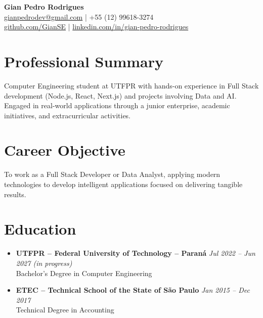 \documentclass[a4paper,10pt]{article}
\begin{document}
\vspace*{-1cm}
\begin{center}
    {\LARGE \textbf{Gian Pedro Rodrigues}}\\
    \vspace{0.2cm}
    \href{mailto:gianpedrodev@gmail.com}{gianpedrodev@gmail.com} \quad | \quad +55 (12) 99618-3274\\
    \href{https://github.com/GianSE}{github.com/GianSE} \quad | \quad 
    \href{https://linkedin.com/in/gian-pedro-rodrigues-330397163}{linkedin.com/in/gian-pedro-rodrigues}
\end{center}

\vspace{0.4cm}

\section*{Professional Summary}
Computer Engineering student at UTFPR with hands-on experience in Full Stack development (Node.js, React, Next.js) and projects involving Data and AI. Engaged in real-world applications through a junior enterprise, academic initiatives, and extracurricular activities.

\section*{Career Objective}
To work as a Full Stack Developer or Data Analyst, applying modern technologies to develop intelligent applications focused on delivering tangible results.

\section*{Education}
\begin{itemize}[leftmargin=*]
    \item \textbf{UTFPR – Federal University of Technology – Paraná} \hfill \textit{Jul 2022 – Jun 2027 (in progress)} \\
    Bachelor's Degree in Computer Engineering
    
    \item \textbf{ETEC – Technical School of the State of São Paulo} \hfill \textit{Jan 2015 – Dec 2017} \\
    Technical Degree in Accounting
\end{itemize}
\end{document}
